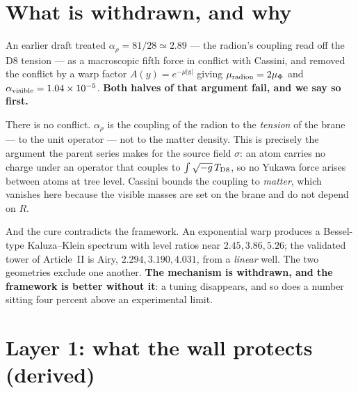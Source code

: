 \section{What is withdrawn, and why}
An earlier draft treated $\alpha_\rho=81/28\simeq2.89$ --- the radion's coupling read off the D8 tension --- as a macroscopic fifth force in conflict with Cassini, and removed the conflict by a warp factor $A(y)=e^{-\mu|y|}$ giving $\mu_{\rm radion}=2\mu_\Phi$ and $\alpha_{\rm visible}=1.04\times10^{-5}$. \textbf{Both halves of that argument fail, and we say so first.}

There is no conflict. $\alpha_\rho$ is the coupling of the radion to the \emph{tension} of the brane --- to the unit operator --- not to the matter density. This is precisely the argument the parent series makes for the source field $\sigma$: an atom carries no charge under an operator that couples to $\int\sqrt{-g}\,T_{\rm D8}$, so no Yukawa force arises between atoms at tree level. Cassini bounds the coupling to \emph{matter}, which vanishes here because the visible masses are set on the brane and do not depend on $R$.

And the cure contradicts the framework. An exponential warp produces a Bessel-type Kaluza--Klein spectrum with level ratios near $2.45,3.86,5.26$; the validated tower of Article~II is Airy, $2.294,3.190,4.031$, from a \emph{linear} well. The two geometries exclude one another. \textbf{The mechanism is withdrawn, and the framework is better without it}: a tuning disappears, and so does a number sitting four percent above an experimental limit.

\section{Layer 1: what the wall protects (derived)}
